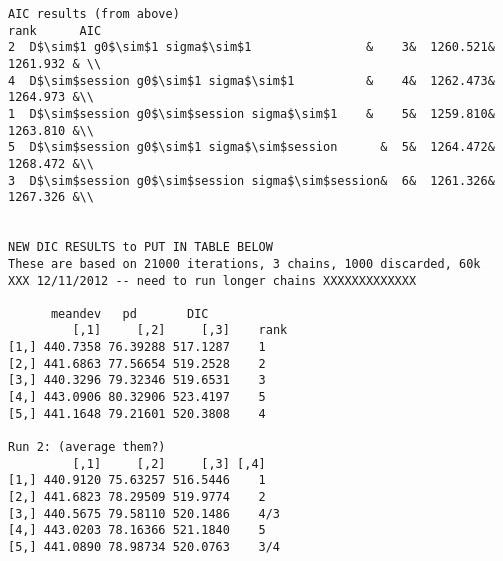 \begin{verbatim}
AIC results (from above)
rank      AIC
2  D$\sim$1 g0$\sim$1 sigma$\sim$1                &    3&  1260.521& 1261.932 & \\
4  D$\sim$session g0$\sim$1 sigma$\sim$1          &    4&  1262.473& 1264.973 &\\
1  D$\sim$session g0$\sim$session sigma$\sim$1    &    5&  1259.810& 1263.810 &\\
5  D$\sim$session g0$\sim$1 sigma$\sim$session      &  5&  1264.472& 1268.472 &\\
3  D$\sim$session g0$\sim$session sigma$\sim$session&  6&  1261.326& 1267.326 &\\


NEW DIC RESULTS to PUT IN TABLE BELOW
These are based on 21000 iterations, 3 chains, 1000 discarded, 60k
XXX 12/11/2012 -- need to run longer chains XXXXXXXXXXXXX

      meandev   pd       DIC
         [,1]     [,2]     [,3]    rank
[1,] 440.7358 76.39288 517.1287    1
[2,] 441.6863 77.56654 519.2528    2
[3,] 440.3296 79.32346 519.6531    3
[4,] 443.0906 80.32906 523.4197    5
[5,] 441.1648 79.21601 520.3808    4

Run 2: (average them?)
         [,1]     [,2]     [,3] [,4]
[1,] 440.9120 75.63257 516.5446    1
[2,] 441.6823 78.29509 519.9774    2
[3,] 440.5675 79.58110 520.1486    4/3
[4,] 443.0203 78.16366 521.1840    5
[5,] 441.0890 78.98734 520.0763    3/4
\end{verbatim}


